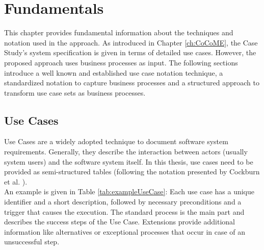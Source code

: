 \chapter{Fundamentals}
\label{ch:Fundamentals}
This chapter provides fundamental information about the techniques and notation used in the approach. As introduced in Chapter \ref{ch:CoCoME}, the Case Study's system specification is given in terms of detailed use cases. However, the proposed approach uses business processes as input. The following sections introduce a well known and established use case notation technique, a standardized notation to capture business processes and a structured approach to transform use case sets as business processes. 


\section{Use Cases}
\label{sec:Fundamentals:UC}
Use Cases are a widely adopted technique to document software system requirements. Generally, they describe the interaction between actors (usually system users) and the software system itself. In this thesis, use cases need to be provided as semi-structured tables (following the notation presented by Cockburn et al. \cite{Cockburn}). \\ An example is given in Table \ref{tab:exampleUseCase}: Each use case has a unique identifier and a short description, followed by necessary preconditions and a trigger that causes the execution. The standard process is the main part and describes the success steps of the Use Case. Extensions provide additional information like alternatives or exceptional processes that occur in case of an unsuccessful step. 




